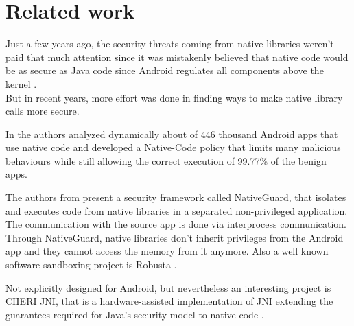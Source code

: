 
\section{Related work}

Just a few years ago, the security threats coming from native libraries weren't paid that much attention since it was mistakenly believed that native code would be as secure as Java code since Android regulates all components above the kernel \cite[p. 1]{Sun:2014:NPA:2627393.2627396}. \\
But in recent years, more effort was done in finding ways to make native library calls more secure.

In \cite{Afonso2016GoingNU} the authors analyzed dynamically about of 446 thousand Android apps that use native code and developed a Native-Code policy that limits many malicious behaviours while still allowing the correct execution of 99.77\% of the benign apps.

The authors from \cite{Sun:2014:NPA:2627393.2627396} present a security framework called NativeGuard, that isolates and executes code from native libraries in a separated non-privileged application. The communication with the source app is done via interprocess communication. Through NativeGuard, native libraries don't inherit privileges from the Android app and they cannot access the memory from it anymore.  
Also a well known software sandboxing project is Robusta \cite{Siefers:2010:RTN:1866307.1866331}. %

Not explicitly designed for Android, but nevertheless an interesting project is CHERI JNI, that is a hardware-assisted implementation of JNI extending the guarantees required for Java's security model to native code \cite{Chisnall:2017:CJS:3093337.3037725}.

